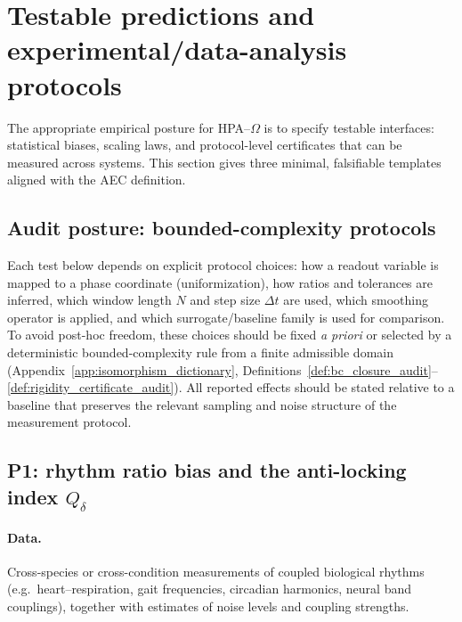 \section{Testable predictions and experimental/data-analysis protocols}
\label{sec:tests}

The appropriate empirical posture for HPA--$\Omega$ is to specify testable interfaces: statistical biases, scaling laws, and protocol-level certificates that can be measured across systems.
This section gives three minimal, falsifiable templates aligned with the AEC definition.

\subsection{Audit posture: bounded-complexity protocols}
\label{sec:test_audit_posture}
Each test below depends on explicit protocol choices: how a readout variable is mapped to a phase coordinate (uniformization), how ratios and tolerances are inferred, which window length $N$ and step size $\Delta t$ are used, which smoothing operator is applied, and which surrogate/baseline family is used for comparison.
To avoid post-hoc freedom, these choices should be fixed \emph{a priori} or selected by a deterministic bounded-complexity rule from a finite admissible domain (Appendix~\ref{app:isomorphism_dictionary}, Definitions~\ref{def:bc_closure_audit}--\ref{def:rigidity_certificate_audit}).
All reported effects should be stated relative to a baseline that preserves the relevant sampling and noise structure of the measurement protocol.

\subsection{P1: rhythm ratio bias and the anti-locking index \texorpdfstring{$Q_\delta$}{Qdelta}}
\label{sec:test_P1}

\paragraph{Data.}
Cross-species or cross-condition measurements of coupled biological rhythms (e.g.\ heart--respiration, gait frequencies, circadian harmonics, neural band couplings), together with estimates of noise levels and coupling strengths.

